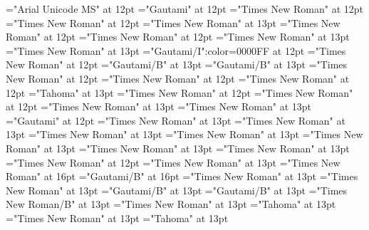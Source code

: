 \documentclass[a4paper]{article}
\begin{document}
 
\pagestyle{plain} 
\font\xitemhi="Arial Unicode MS" at 12pt
\font\xitemte="Gautami" at 12pt
\font\xitemxitemCmPossibilitypublishStemTransTypeAbbreviationPubbefore="Times New Roman" at 12pt
\font\xitemxitemcomplexformrefsbefore="Times New Roman" at 12pt
\font\xitemxitemdefinitionbefore="Times New Roman" at 13pt
\font\xitemxitemdefinitionLcbefore="Times New Roman" at 12pt
\font\xitemxitemdefinitionLdbefore="Times New Roman" at 12pt
\font\xitemxitementryrefcomponentbefore="Times New Roman" at 13pt
\font\xitemxitementryreftypebefore="Times New Roman" at 13pt
\font\xitemxitemexamplebefore="Gautami/I":color=0000FF at 12pt
\font\xitemxitemexamplesbefore="Times New Roman" at 12pt
\font\xitemxitemheadwordbefore="Gautami/B" at 13pt
\font\xitemxitemLexEntrypublishStemComponentTargetHeadWordRefbefore="Gautami/B" at 13pt
\font\xitemxitemLexSensepublishStemDefinitionPubbefore="Times New Roman" at 12pt
\font\xitemxitemLexSensepublishStemDefinitionPubLdbefore="Times New Roman" at 12pt
\font\xitemxitemprimaryrefsbefore="Times New Roman" at 12pt
\font\xitemxitempronunciationbefore="Tahoma" at 13pt
\font\xitemxitempronunciationsbefore="Times New Roman" at 12pt
\font\xitemxitemsemanticdomainsbefore="Times New Roman" at 12pt
\font\sensesensesensesbefore="Times New Roman" at 13pt
\font\xitemxitemtranslationbefore="Times New Roman" at 13pt
\font\xitemxitemtranslationLdbefore="Gautami" at 12pt
\font\xitemxitemcrossrefbefore="Times New Roman" at 13pt
\font\xitemxitemcrossreftargetsbefore="Times New Roman" at 13pt
\font\xitemxitemcrossreftypebefore="Times New Roman" at 13pt
\font\xitemxitemheadwordminorbefore="Times New Roman" at 13pt
\font\xitemxitemmainentryrefbefore="Times New Roman" at 13pt
\font\xitemxitemmainentryrefminorbefore="Times New Roman" at 13pt
\font\xitemxitempronunciationminorbefore="Times New Roman" at 13pt
\font\xitemxitemsensecrossrefbefore="Times New Roman" at 12pt
\font\xitemxitemsensemainentryrefbefore="Times New Roman" at 13pt
\font{}="Times New Roman" at 16pt
\font{}="Gautami/B" at 16pt
\font{}="Times New Roman" at 13pt
\font\entryletDatadicBody="Times New Roman" at 13pt
\font\headwordggoTeluINentryletDatadicBody="Gautami/B" at 13pt
\font\headwordafterentryletDatadicBody="Gautami/B" at 13pt
\font\spanenheadwordggoTeluINentryletDatadicBody="Times New Roman/B" at 13pt
\font\spanentryletDatadicBody="Times New Roman" at 13pt
\font\pronunciationggofonipaxemicspanentryletDatadicBody="Tahoma" at 13pt
\font\spanenpronunciationggofonipaxemicspanentryletDatadicBody="Times New Roman" at 13pt
\font\spanggofonipaxemicpronunciationggofonipaxemicspanentryletDatadicBody="Tahoma" at 13pt
\end{document}
